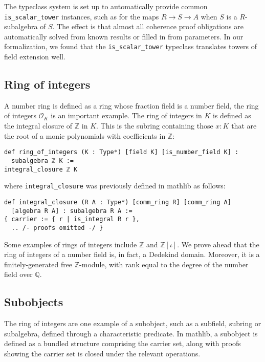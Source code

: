\documentclass[a4paper,USenglish,cleveref, autoref, thm-restate]{lipics-v2021}
\newcommand{\lean}[1]{\texttt{#1}\xspace} %
\newcommand{\OK}[1][K]{\mathcal{O}_{#1}}
\newcommand{\Q}{\mathbb{Q}}
\newcommand{\Z}{\mathbb{Z}}
\begin{document}
The typeclass system is set up to automatically provide common \lean{is\_scalar\_tower} instances,
such as for the maps $R \to S \to A$ when $S$ is a $R$-subalgebra of $S$.
The effect is that almost all coherence proof obligations are automatically solved from known results or filled in from parameters.
In our formalization, we found that the \lean{is\_scalar\_tower} typeclass translates towers of field extension well.

\subsection{Ring of integers} \label{sec:ring-of-integers}

A number ring is defined as a ring whose fraction field is a number field, the ring of integers $\OK$ is an important example.
The ring of integers in $K$ is defined as the integral closure of $\Z$ in $K$.
This is the subring containing those $x : K$ that are the root of a monic polynomials with coefficients in $\Z$:
\begin{lstlisting}
def ring_of_integers (K : Type*) [field K] [is_number_field K] :
  subalgebra ℤ K :=
integral_closure ℤ K
\end{lstlisting}
where \lean{integral\_closure} was previously defined in mathlib as follows:
\begin{lstlisting}
def integral_closure (R A : Type*) [comm_ring R] [comm_ring A]
  [algebra R A] : subalgebra R A :=
{ carrier := { r | is_integral R r },
  .. /- proofs omitted -/ }
\end{lstlisting}

Some examples of rings of integers include $\Z$ and $\Z[\iota]$. We prove ahead that the ring of integers of a number field is, in fact, a Dedekind domain. Moreover, it is a finitely-generated free $\Z$-module, with rank equal to the degree of the number field over $\Q$.


\subsection{Subobjects} \label{sec:subobjects}

The ring of integers are one example of a subobject, such as a subfield, subring or subalgebra, defined through a characteristic predicate.
In mathlib, a subobject is defined as a bundled structure comprising the carrier set,
along with proofs showing the carrier set is closed under the relevant operations.
\end{document}
